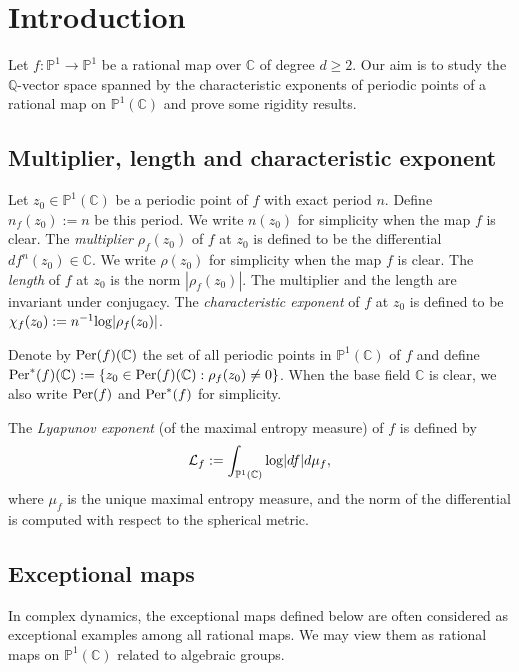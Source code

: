 \documentclass[12pt]{amsart}
\theoremstyle{plain}
\theoremstyle{remark}
\theoremstyle{definition}
\def\Q{\mathbb Q}
\def\C{\mathbb C}
\def\P{\mathbb P}
\begin{document}
	
\tableofcontents
	
\section{Introduction}
Let $f: \P^1\to \P^1$ be a rational map over $\C$ of degree $d\geq2$.
Our aim is to study the $\Q$-vector space spanned by the characteristic exponents of periodic points of a rational map on $\P^1(\C)$ and prove some rigidity results.


\subsection{Multiplier, length and characteristic exponent}
Let $z_0\in\P^1(\C)$ be a periodic point of $f$ with exact period $n$. Define $n_f(z_0):=n$ be this period. We write $n(z_0)$ for simplicity when the map $f$ is clear. The \emph{multiplier}  $\rho_f(z_0)$ of $f$ at $z_0$ is defined to be the differential $df^{n}(z_0)\in\C$. We write $\rho(z_0)$ for simplicity when the map $f$ is clear. 
The \emph{length} of $f$ at $z_0$ is the norm $|\rho_f(z_0)|.$
The multiplier and the length are invariant under conjugacy. 
The \emph{characteristic exponent} of $f$ at $z_0$ is defined to be $\chi_f(z_0):=n^{-1}{\rm log}\lvert\rho_f(z_0)\rvert$. 

\medskip

Denote by ${\rm Per}(f)(\C)$ the set of all periodic points in $\P^1(\C)$ of $f$
and define ${\rm Per}^*(f)(\C):=\{z_0\in{\rm Per}(f)(\C):\rho_f(z_0)\neq0\}$. When the base field $\C$ is clear, we also write ${\rm Per}(f)$ and ${\rm Per}^*(f)$ for simplicity. 


\medskip


The \emph{Lyapunov exponent} (of the maximal entropy measure) of $f$ is defined by $$\mathcal{L}_f:=\int_{\P^1(\C)}{\rm log}|d f| d\mu_f,$$ where $\mu_f$ is the unique maximal entropy measure, and the norm of the differential is computed with respect to the spherical metric.


\subsection{Exceptional maps}
In complex dynamics, the exceptional maps defined below are often considered as exceptional examples among all rational maps.
We may view them as  rational maps on $\P^1(\C)$ related to algebraic groups.
\end{document}
